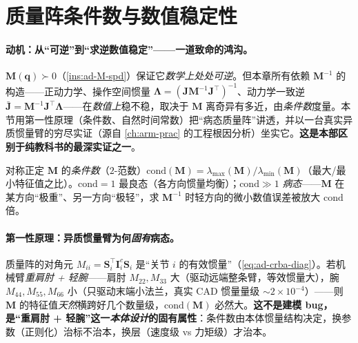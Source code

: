 \section{质量阵条件数与数值稳定性}
\label{sec:ad-conditioning}

\paragraph{动机：从“可逆”到“求逆数值稳定”——一道致命的鸿沟。}
$\mathbf{M}(\mathbf{q})\succ0$（\cref{ins:ad-M-spd}）保证它\emph{数学上处处可逆}。但本章所有依赖 $\mathbf{M}^{-1}$ 的构造——正动力学、操作空间惯量 $\boldsymbol{\Lambda}=(\mathbf{J}\mathbf{M}^{-1}\mathbf{J}^\top)^{-1}$、动力学一致逆 $\bar{\mathbf{J}}=\mathbf{M}^{-1}\mathbf{J}^\top\boldsymbol{\Lambda}$——在\emph{数值上}稳不稳，取决于 $\mathbf{M}$ 离奇异有多近，由\emph{条件数}度量。本节用第一性原理（条件数、自然时间常数）把“病态质量阵”讲透，并以一台真实异质惯量臂的穷尽实证（源自 \cref{ch:arm-prac} 的工程根因分析）坐实它。\textbf{这是本部区别于纯教科书的最深实证之一}。

\begin{definition}[质量阵条件数]
\label{def:ad-condM}
对称正定 $\mathbf{M}$ 的\emph{条件数}（$2$-范数）$\mathrm{cond}(\mathbf{M})=\lambda_{\max}(\mathbf{M})/\lambda_{\min}(\mathbf{M})$（最大/最小特征值之比）。$\mathrm{cond}=1$ 最良态（各方向惯量均衡）；$\mathrm{cond}\gg1$ \emph{病态}——$\mathbf{M}$ 在某方向“极重”、另一方向“极轻”，求 $\mathbf{M}^{-1}$ 时轻方向的微小数值误差被放大 $\mathrm{cond}$ 倍。
\end{definition}

\paragraph{第一性原理：异质惯量臂为何\emph{固有}病态。}
质量阵的对角元 $M_{ii}=\mathbf{S}_i^\top\mathbf{I}^c_i\mathbf{S}_i$ 是“关节 $i$ 的有效惯量”（\cref{eq:ad-crba-diag}）。若机械臂\emph{重肩肘 + 轻腕}——肩肘 $M_{22},M_{33}$ 大（驱动远端整条臂，等效惯量大），腕 $M_{44},M_{55},M_{66}$ 小（只驱动末端小法兰，真实 CAD 惯量量级 $\sim2\times10^{-4}$）——则 $\mathbf{M}$ 的特征值\emph{天然}横跨好几个数量级，$\mathrm{cond}(\mathbf{M})$ 必然大。\textbf{这不是建模 bug，是“重肩肘 + 轻腕”这一\emph{本体设计}的固有属性}：条件数由本体惯量结构决定，换参数（正则化）治标不治本，换层（速度级 vs 力矩级）才治本。

